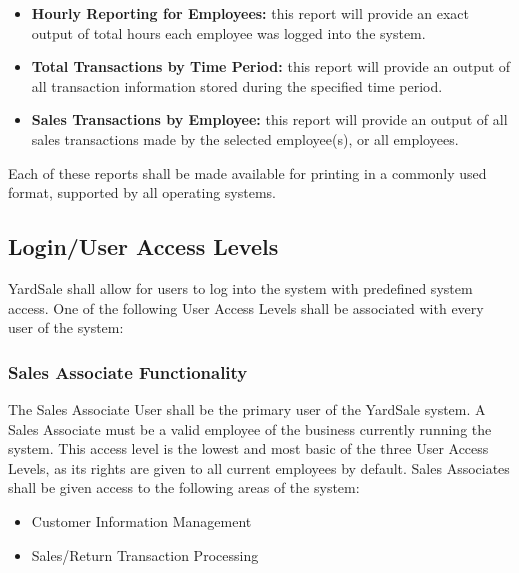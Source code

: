 \documentclass{report}
\begin{document}
            \begin{itemize}
                \item {\bf Hourly Reporting for Employees:} this
                report will provide an exact output of total hours
                each employee was logged into the system.
                \item {\bf Total Transactions by Time Period:} this report will
                provide an output of all transaction information
                stored during the specified time period.
                \item {\bf Sales Transactions by Employee:} this report
                will provide an output of all sales transactions
                made by the selected employee(s), or all
                employees.
            \end{itemize}

            \noindent Each of these reports shall be made
            available for printing in a commonly used format,
            supported by all operating systems.

        \subsection{Login/User Access Levels}
            YardSale shall allow for users to log into the system
            with predefined system access.  One of the following
            User Access Levels shall be associated with every user
            of the system:

            \subsubsection{Sales Associate Functionality}
                The Sales Associate User shall be the
                primary user of the YardSale system.  A Sales Associate
                must be a valid employee of the business currently
                running the system.  This access
                level is the lowest and most basic of the three
                User Access Levels, as its rights are given to all
                current employees by default.  Sales Associates
                shall be given access to the following areas of the
                system:

                \begin{itemize}
                    \item Customer Information Management
                    \item Sales/Return Transaction Processing
                \end{itemize}
\end{document}
